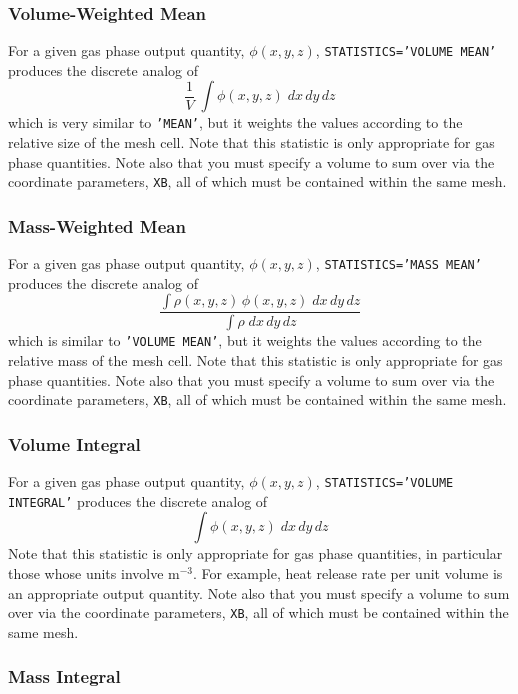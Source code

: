 \documentclass[11pt]{book}
\newcommand{\ct}{\tt\small}
\newcommand{\be}{\begin{equation}}
\newcommand{\ee}{\end{equation}}
\begin{document}
\subsubsection{Volume-Weighted Mean}

For a given gas phase output quantity, $\phi(x,y,z)$, {\ct STATISTICS='VOLUME MEAN'} produces the discrete analog of
\be \frac{1}{V} \; \int \phi(x,y,z) \; dx \, dy \, dz \ee
which is very similar to {\ct 'MEAN'}, but it weights the values according to the relative size of the mesh cell. Note that this
statistic is only appropriate for gas phase quantities. Note also that you must specify a volume to sum over via the
coordinate parameters, {\ct XB}, all of which must be contained within the same mesh.

\subsubsection{Mass-Weighted Mean}

For a given gas phase output quantity, $\phi(x,y,z)$, {\ct STATISTICS='MASS MEAN'} produces the discrete analog of
\be \frac{ \int \rho(x,y,z) \, \phi(x,y,z) \; dx \, dy \, dz}{\int \rho \; dx \, dy \, dz}  \ee
which is similar to {\ct 'VOLUME MEAN'}, but it weights the values according to the relative mass of the mesh cell. Note that this
statistic is only appropriate for gas phase quantities. Note also that you must specify a volume to sum over via the
coordinate parameters, {\ct XB}, all of which must be contained within the same mesh.

\subsubsection{Volume Integral}

For a given gas phase output quantity, $\phi(x,y,z)$, {\ct STATISTICS='VOLUME INTEGRAL'} produces the discrete analog of
\be \int \phi(x,y,z) \; dx \, dy \, dz \ee
Note that this statistic is only appropriate for gas phase quantities, in particular those whose units involve m$^{-3}$. For example,
heat release rate per unit volume is an appropriate output quantity. Note also that you must specify a volume to sum over via the
coordinate parameters, {\ct XB}, all of which must be contained within the same mesh.

\subsubsection{Mass Integral}
\end{document}
